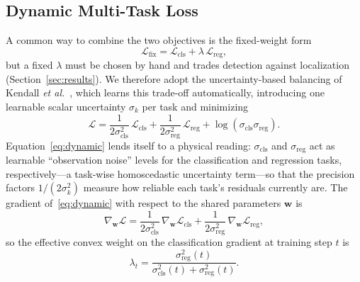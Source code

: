 \documentclass[sensors,article,submit,pdftex,moreauthors]{Definitions/mdpi}
\begin{document}
\subsection{Dynamic Multi-Task Loss}
A common way to combine the two objectives is the fixed-weight form
\begin{equation}
    \mathcal{L}_{\mathrm{fix}} = \mathcal{L}_{\mathrm{cls}} + \lambda\,\mathcal{L}_{\mathrm{reg}},
    \label{eq:fixed}
\end{equation}
but a fixed $\lambda$ must be chosen by hand and trades detection against localization (Section~\ref{sec:results}). We therefore adopt the uncertainty-based balancing of Kendall \emph{et al.}~\cite{kendall2018mtl}, which learns this trade-off automatically, introducing one learnable scalar uncertainty $\sigma_k$ per task and minimizing
\begin{equation}
    \mathcal{L} = \frac{1}{2\sigma_{\mathrm{cls}}^{2}}\,\mathcal{L}_{\mathrm{cls}} + \frac{1}{2\sigma_{\mathrm{reg}}^{2}}\,\mathcal{L}_{\mathrm{reg}} + \log\!\left(\sigma_{\mathrm{cls}}\sigma_{\mathrm{reg}}\right).
    \label{eq:dynamic}
\end{equation}
Equation~\eqref{eq:dynamic} lends itself to a physical reading: $\sigma_{\mathrm{cls}}$ and $\sigma_{\mathrm{reg}}$ act as learnable ``observation noise'' levels for the classification and regression tasks, respectively---a task-wise homoscedastic uncertainty term---so that the precision factors $1/(2\sigma_k^{2})$ measure how reliable each task's residuals currently are. The gradient of~\eqref{eq:dynamic} with respect to the shared parameters $\mathbf{w}$ is
\begin{equation}
    \nabla_{\mathbf{w}}\mathcal{L} = \frac{1}{2\sigma_{\mathrm{cls}}^{2}}\,\nabla_{\mathbf{w}}\mathcal{L}_{\mathrm{cls}} + \frac{1}{2\sigma_{\mathrm{reg}}^{2}}\,\nabla_{\mathbf{w}}\mathcal{L}_{\mathrm{reg}},
    \label{eq:grad}
\end{equation}
so the effective convex weight on the classification gradient at training step $t$ is
\begin{equation}
    \lambda_t = \frac{\sigma_{\mathrm{reg}}^{2}(t)}{\sigma_{\mathrm{cls}}^{2}(t)+\sigma_{\mathrm{reg}}^{2}(t)}.
    \label{eq:lambda_t}
\end{equation}
\end{document}
